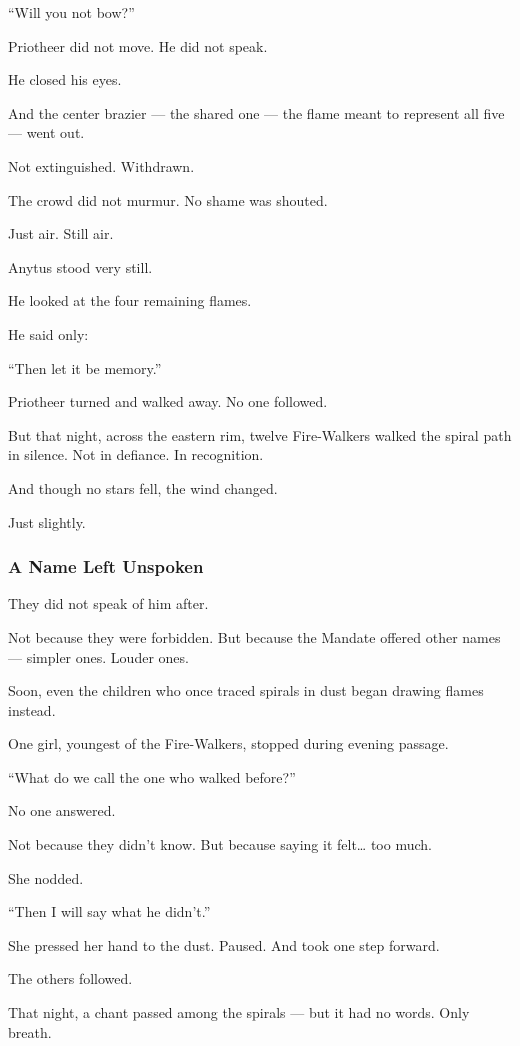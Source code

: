 \documentclass[12pt]{article}
\begin{document}
 “Will you not bow?”

Priotheer did not move.  
He did not speak.

He closed his eyes.

And the center brazier — the shared one —  
the flame meant to represent all five —  
went out.

Not extinguished.  
Withdrawn.

The crowd did not murmur.  
No shame was shouted.

Just air.  
Still air.

Anytus stood very still.

He looked at the four remaining flames.

He said only:

 “Then let it be memory.”

Priotheer turned and walked away.  
No one followed.

But that night, across the eastern rim,  
twelve Fire-Walkers walked the spiral path in silence.  
Not in defiance.  
In recognition.

And though no stars fell,  
the wind changed.

Just slightly.

\dotfill

\subsubsection{A Name Left Unspoken}

They did not speak of him after.

Not because they were forbidden.  
But because the Mandate offered other names —  
simpler ones.  
Louder ones.

Soon, even the children who once traced spirals in dust  
began drawing flames instead.

One girl, youngest of the Fire-Walkers,  
stopped during evening passage.

 “What do we call the one who walked before?”

No one answered.

Not because they didn’t know.  
But because saying it felt… too much.

She nodded.

 “Then I will say what he didn’t.”

She pressed her hand to the dust.  
Paused.  
And took one step forward.

The others followed.

That night, a chant passed among the spirals —  
but it had no words.  
Only breath.
\end{document}
